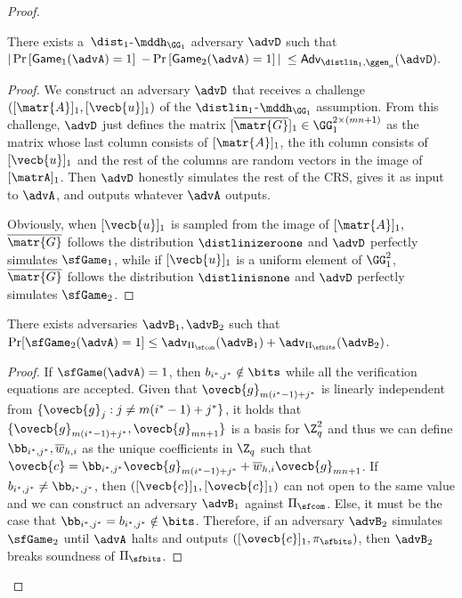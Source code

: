 \begin{proof}
\begin{lemma} There exists a\ $\dist_1$-$\mddh_{\GG_1}$ adversary $\advD$ such that
$|\Pr\left[\mathsf{Game}_{1}(\advA)=1\right]$ $-\Pr\left[\mathsf{Game}_{2}(\advA)=1\right]|$ $\leq
    \mathsf{Adv}_{\distlin_1,\ggen_a}(\advD).$
\end{lemma}
\begin{proof}
We construct an adversary $\advD$ that receives 
a challenge $([\matr{A}]_1,[\vecb{u}]_1)$ of the 
$\distlin_1$-$\mddh_{\GG_1}$ assumption. From this challenge, $\advD$ just defines the matrix  $[\overline{\matr{G}}]_1\in\GG_1^{2\times(mn+1)}$ as the matrix whose last column consists of $[\matr{A}]_1$, the ith column consists of $[\vecb{u}]_1$ and the rest of the columns are random vectors in the image of $[\matrA]_1$. Then $\advD$ honestly simulates the rest of the CRS, gives it as input to $\advA$, and outputs whatever $\advA$ outputs.

Obviously, when $[\vecb{u}]_1$ is sampled from 
the image of $[\matr{A}]_1,$ $\overline{\matr{G}}$ follows the distribution $\distlinizeroone$ and $\advD$ perfectly simulates $\sfGame_1$, while if $[\vecb{u}]_1$ is a uniform element of $\GG^2_1$, $\overline{\matr{G}}$ follows the distribution $\distlinisnone$ and $\advD$ perfectly simulates $\sfGame_2$. 
\end{proof}

\begin{lemma}
There exists adversaries $\advB_1,\advB_2$ such that $\Pr[\sfGame_2(\advA)=1]\leq\adv_{\Pi_\sfcom}(\advB_1)+\adv_{\Pi_\sfbits}(\advB_2)$.
\end{lemma}

\begin{proof}
If $\sfGame(\advA)=1$, then $b_{i^*,j^*}\notin\bits$ while all the verification equations are accepted. Given that $\ovecb{g}_{m(i^*-1)+j^*}$ is linearly independent from $\{\ovecb{g}_j:j\neq m(i^*-1)+j^*\}$, it holds that $\{\ovecb{g}_{m(i^*-1)+j^*},\ovecb{g}_{mn+1}\}$ is a basis for $\Z_q^2$ and thus we can define $\bb_{i^*,j^*},\overline{w}_{h,i}$ as the unique coefficients in $\Z_q$ such that $\ovecb{c} = \bb_{i^*,j^*}\ovecb{g}_{m(i^*-1)+j^*}+\overline{w}_{h,i}\ovecb{g}_{mn+1}$. If $b_{i^*,j^*}\neq\bb_{i^*,j^*}$, then $([\vecb{c}]_1,[\ovecb{c}]_1)$ can not open to the same value and we can construct an adversary $\advB_1$ against $\Pi_\sfcom$. Else, it must be the case that $\bb_{i^*,j^*}=b_{i^*,j^*}\notin\bits$. Therefore, if an adversary $\advB_2$ simulates $\sfGame_2$ until $\advA$ halts and outputs $([\ovecb{c}]_1,\pi_\sfbits)$, then $\advB_2$ breaks soundness of $\Pi_\sfbits$. 
\end{proof}


\end{proof}
